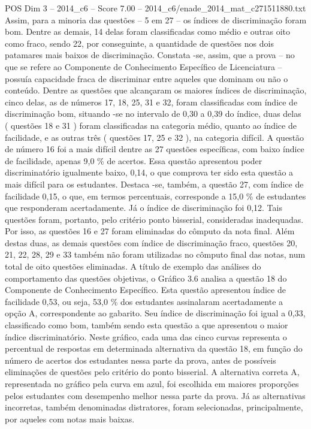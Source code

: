 \begin{textsample}{POS Dim 3 – 2014\_c6 – Score 7.00 – 2014\_c6/enade\_2014\_mat\_c271511880.txt}
Assim, para a minoria das questões – 5 em 27 – os índices de discriminação foram bom.
Dentre as demais, 14 delas foram classificadas como médio e outras oito como fraco, sendo 22, por conseguinte, a quantidade de questões nos dois patamares mais baixos de discriminação.
Constata -se, assim, que a prova – no que se refere ao Componente de Conhecimento Específico de Licenciatura – possuía capacidade fraca de discriminar entre aqueles que dominam ou não o conteúdo.
Dentre as questões que alcançaram os maiores índices de discriminação, cinco delas, as de números 17, 18, 25, 31 e 32, foram classificadas com índice de discriminação bom, situando -se no intervalo de 0,30 a 0,39 do índice, duas delas ( questões 18 e 31 ) foram classificadas na categoria médio, quanto ao índice de facilidade, e as outras três ( questões 17, 25 e 32 ), na categoria difícil.
A questão de número 16 foi a mais difícil dentre as 27 questões específicas, com baixo índice de facilidade, apenas 9,0 \% de acertos.
Essa questão apresentou poder discriminatório igualmente baixo, 0,14, o que comprova ter sido esta questão a mais difícil para os estudantes.
Destaca -se, também, a questão 27, com índice de facilidade 0,15, o que, em termos percentuais, corresponde a 15,0 \% de estudantes que responderam acertadamente.
Já o índice de discriminação foi 0,12.
Tais questões foram, portanto, pelo critério ponto bisserial, consideradas inadequadas.
Por isso, as questões 16 e 27 foram eliminadas do cômputo da nota final.
Além destas duas, as demais questões com índice de discriminação fraco, questões 20, 21, 22, 28, 29 e 33 também não foram utilizadas no cômputo final das notas, num total de oito questões eliminadas.
A título de exemplo das análises do comportamento das questões objetivas, o Gráfico 3.6 analisa a questão 18 do Componente de Conhecimento Específico.
Esta questão apresentou índice de facilidade 0,53, ou seja, 53,0 \% dos estudantes assinalaram acertadamente a opção A, correspondente ao gabarito.
Seu índice de discriminação foi igual a 0,33, classificado como bom, também sendo esta questão a que apresentou o maior índice discriminatório.
Neste gráfico, cada uma das cinco curvas representa o percentual de respostas em determinada alternativa da questão 18, em função do número de acertos dos estudantes nessa parte da prova, antes de possíveis eliminações de questões pelo critério do ponto bisserial.
A alternativa correta A, representada no gráfico pela curva em azul, foi escolhida em maiores proporções pelos estudantes com desempenho melhor nessa parte da prova.
Já as alternativas incorretas, também denominadas distratores, foram selecionadas, principalmente, por aqueles com notas mais baixas.

\end{textsample}
